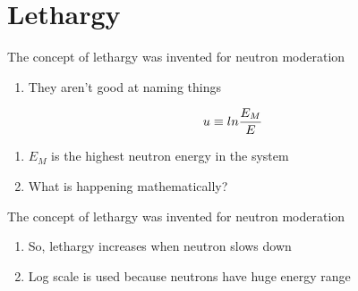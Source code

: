 \documentclass[aspectratio=1610,pdftex,dvipsnames,compress,xcolor={dvipsnames}]{beamer}
\begin{document}
\section{Lethargy}


\addtocounter{framenumber}{-1} 
\begin{frame}{The concept of lethargy was invented for neutron moderation}
    \begin{enumerate}[series=outerlist,topsep=0pt,itemsep=21pt,leftmargin=*,label=(\arabic*)]
        \item[]They aren't good at naming things
    \end{enumerate}

    \vspace*{\fill}

    \begin{equation}
        \LARGE
        u \equiv ln \frac{E_M}{E}
    \end{equation}

    \vspace*{\fill}

    \begin{enumerate}[series=outerlist,topsep=0pt,itemsep=21pt,leftmargin=*,label=(\arabic*)]
        \item[]$E_M$ is the highest neutron energy in the system
        \item[]What is happening mathematically?
    \end{enumerate}
\end{frame}


\begin{frame}{The concept of lethargy was invented for neutron moderation}
    \begin{enumerate}[series=outerlist,topsep=0pt,itemsep=21pt,leftmargin=*,label=(\arabic*)]
        \item[]So, lethargy increases when neutron slows down
        \item[]Log scale is used because neutrons have huge energy range
    \end{enumerate}
\end{frame}
\end{document}
